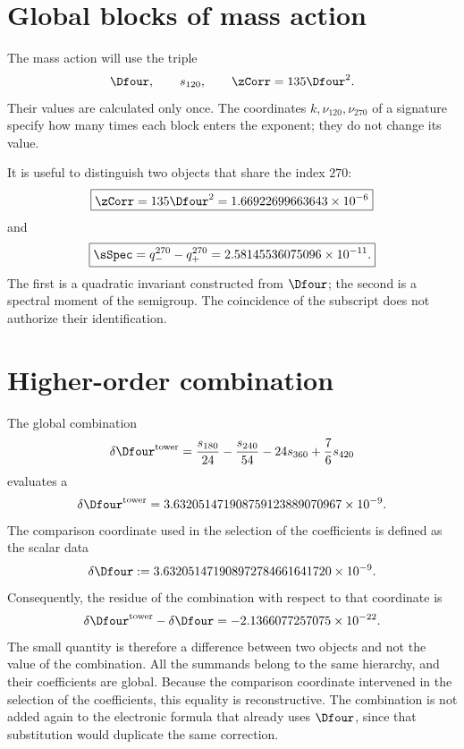 \section{Global blocks of mass action}

The mass action will use the triple
\[
 \Dfour,\qquad s_{120},\qquad \zCorr=135\Dfour^2.
\]
Their values are calculated only once. The coordinates
\(k,\nu_{120},\nu_{270}\) of a signature specify how many times
each block enters the exponent; they do not change its value.

It is useful to distinguish two objects that share the index \(270\):
\[
 \boxed{\zCorr=135\Dfour^2
 =1.66922699663643\times10^{-6}}
\]
and
\[
 \boxed{\sSpec=q_-^{270}-q_+^{270}
 =2.58145536075096\times10^{-11}.}
\]
The first is a quadratic invariant constructed from \(\Dfour\); the
second is a spectral moment of the semigroup. The coincidence of the subscript does not
authorize their identification.

\section{Higher-order combination}

The global combination
\[
 \delta\Dfour^{\rm tower}
 =\frac{s_{180}}{24}-\frac{s_{240}}{54}
 -24s_{360}+\frac76s_{420}
\]
evaluates a
\[
 \delta\Dfour^{\rm tower}
 =3.632051471908759123889070967\times10^{-9}.
\]
The comparison coordinate used in the selection of the
coefficients is defined as the scalar data
\[
 \delta\Dfour
 :=3.632051471908972784661641720\times10^{-9}.
\]
Consequently, the residue of the combination with respect to that coordinate is
\[
 \delta\Dfour^{\rm tower}-\delta\Dfour
 =-2.1366077257075\times10^{-22}.
\]
The small quantity is therefore a difference between two objects and not the value
of the combination. All the summands belong to the same hierarchy, and their
coefficients are global. Because the comparison coordinate intervened in the
selection of the coefficients, this equality is reconstructive. The
combination is not added again to the electronic formula that already uses
\(\Dfour\), since that substitution would duplicate the same correction.

